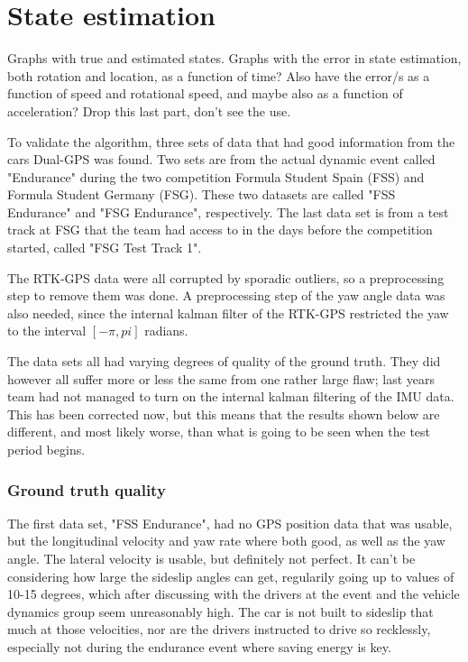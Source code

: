 \section{State estimation}

Graphs with true and estimated states. Graphs with the error in state estimation, both rotation and location, as a function of time? Also have the error/s as a function of speed and rotational speed, and maybe also as a function of acceleration? Drop this last part, don't see the use. 

To validate the algorithm, three sets of data that had good information from the cars Dual-GPS was found. Two sets are from the actual dynamic event called "Endurance" during the two competition Formula Student Spain (FSS) and Formula Student Germany (FSG). These two datasets are called "FSS Endurance" and "FSG Endurance", respectively. The last data set is from a test track at FSG that the team had access to in the days before the competition started, called "FSG Test Track 1". 

The RTK-GPS data were all corrupted by sporadic outliers, so a preprocessing step to remove them was done. A preprocessing step of the yaw angle data was also needed, since the internal kalman filter of the RTK-GPS restricted the yaw to the interval $[-\pi,pi]$ radians. 

The data sets all had varying degrees of quality of the ground truth. They did however all suffer more or less the same from one rather large flaw; last years team had not managed to turn on the internal kalman filtering of the IMU data. This has been corrected now, but this means that the results shown below are different, and most likely worse, than what is going to be seen when the test period begins.

\subsubsection{Ground truth quality}

The first data set, "FSS Endurance", had no GPS position data that was usable, but the longitudinal velocity and yaw rate where both good, as well as the yaw angle. The lateral velocity is usable, but definitely not perfect. It can't be considering how large the sideslip angles can get, regularily going up to values of 10-15 degrees, which after discussing with the drivers at the event and the vehicle dynamics group seem unreasonably high. The car is not built to sideslip that much at those velocities, nor are the drivers instructed to drive so recklessly, especially not during the endurance event where saving energy is key. 

